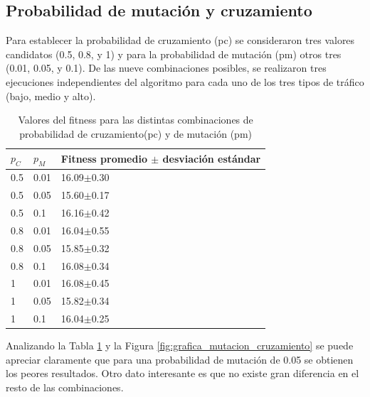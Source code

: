 \subsection{Probabilidad de mutación y cruzamiento}

Para establecer la probabilidad de cruzamiento (pc) se consideraron tres valores candidatos (0.5, 0.8, y 1) y para la probabilidad de mutación (pm) otros tres (0.01,  0.05,  y  0.1). De las nueve combinaciones posibles, se realizaron tres ejecuciones independientes del algoritmo para cada uno de los tres tipos de tráfico (bajo, medio y alto).  
 
 \begin{table}[H]
 	\renewcommand{\arraystretch}{1.2}
 	\caption{Valores del fitness para las distintas combinaciones de probabilidad de cruzamiento(pc) y de mutación (pm)}
 	\label{table:parametro_mutacion_cruzamiento}
 	\centering
 	\begin{tabular}{p{1cm}p{1cm}p{3.5cm} }
 		\hline
 		$p_C$& 
 		$p_M$ & 
 		Fitness promedio  $\pm$ desviación estándar\\ 
 		\hline
 		0.5 & 0.01  &  16.09$\pm$0.30\\
 		0.5 & 0.05 &  15.60$\pm$0.17\\
 		0.5 & 0.1  &  16.16$\pm$0.42\\
 		0.8 & 0.01  &  16.04$\pm$0.55\\
 		0.8 & 0.05  &  15.85$\pm$0.32\\
 		0.8 & 0.1  &  16.08$\pm$0.34\\
 		1 & 0.01 &  16.08$\pm$0.45\\
 		1 & 0.05 &  15.82$\pm$0.34\\
 		1 & 0.1 &  16.04$\pm$0.25\\
 		\hline
 	\end{tabular}
 \end{table}
 
Analizando la Tabla \ref{table:parametro_mutacion_cruzamiento} y la Figura \ref{fig:grafica_mutacion_cruzamiento} se puede apreciar claramente que para una probabilidad de mutación de 0.05 se obtienen los peores resultados. Otro dato interesante es que no existe gran diferencia en el resto de las combinaciones.

